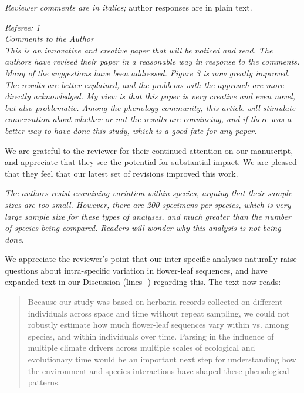 \documentclass{article}[12pt]
\begin{document}


\emph{Reviewer comments are in italics;} author responses are in plain text.

\emph{Referee: 1}\\
\emph{Comments to the Author}\\
\emph{This is an innovative and creative paper that will be noticed and read. The authors have revised their paper in a reasonable way in response to the comments. Many of the suggestions have been addressed.  Figure 3 is now greatly improved. The results are better explained, and the problems with the approach are more directly acknowledged. My view is that this paper is very creative and even novel, but also problematic. Among the phenology community, this article will stimulate conversation about whether or not the results are convincing, and if there was a better way to have done this study, which is a good fate for any paper.}

We are grateful to the reviewer for their continued attention on our manuscript, and appreciate that they see the potential for substantial impact. We are pleased that they feel that our latest set of revisions improved this work. 

\emph{The authors resist examining variation within species, arguing that their sample sizes are too small. However, there are 200 specimens per species, which is very large sample size for these types of analyses, and much greater than the number of species being compared.  Readers will wonder why this analysis is not being done.}

We appreciate the reviewer's point that our inter-specific analyses naturally raise questions about intra-specific variation in flower-leaf sequences, and have expanded text in our Discussion (lines -) regarding this. The text now reads: %

\begin{quote}Because our study was based on herbaria records collected on different individuals across space and time without repeat sampling, we could not robustly estimate how much flower-leaf sequences vary within vs. among species, and within individuals over time. Parsing in the influence of multiple climate drivers across multiple scales of ecological and evolutionary time would be an important next step for understanding how the environment and species interactions have shaped these phenological patterns. \end{quote}
\end{document}
